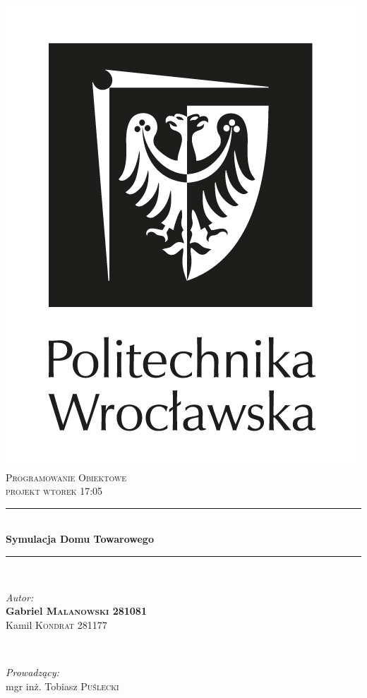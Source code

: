 \documentclass[11pt]{article}
\begin{document}
\begin{titlepage}
\newcommand{\HRule}{\rule{\linewidth}{0.5mm}} %
\center %
\includegraphics[scale = 0.21]{pwr-logo.png}\\[2cm]
\textsc{\Large Programowanie Obiektowe}\\[0.5cm] 
\textsc{\large projekt wtorek 17:05}\\[0.5cm]
\HRule \\[0.4cm]
{ \huge \bfseries Symulacja Domu Towarowego
}\\[0.4cm] 
\HRule \\[0.8cm]
\begin{minipage}{0.5\textwidth}
\begin{flushleft} \large
\emph{Autor:}\\
\textbf{Gabriel \textsc{Malanowski} 281081} \\
Kamil \textsc{Kondrat} 281177 \\

\end{flushleft}
\end{minipage}
~
\begin{minipage}{0.4\textwidth}
\begin{flushright} \large
\emph{Prowadzący:} \\
mgr inż. Tobiasz \textsc{Puślecki} %
\end{flushright}
\end{minipage}\\[5cm]

\vfill %
\end{titlepage}
\end{document}
